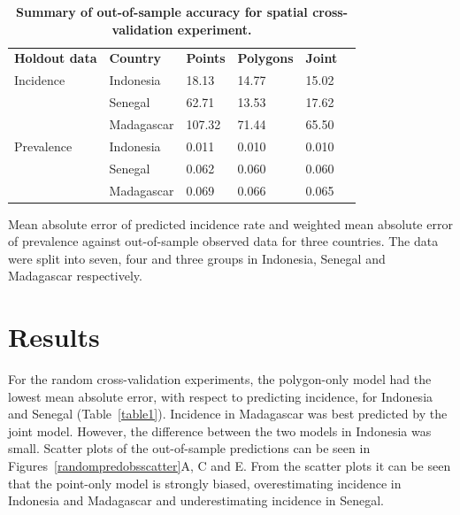 \documentclass[10pt,letterpaper]{article}
\newlength\savedwidth
\newcommand\thickhline{\noalign{\global\savedwidth\arrayrulewidth\global\arrayrulewidth 2pt}%
\hline
\noalign{\global\arrayrulewidth\savedwidth}}
\begin{document}
\begin{table}[!t]
\begin{adjustwidth}{-2.25in}{0in} %
\centering
\caption{
{\bf Summary of out-of-sample accuracy for spatial cross-validation experiment.}}
\begin{tabular}{llllll}
\hline
{\bf Holdout data} & {\bf Country} &  {\bf Points} & {\bf Polygons} & {\bf Joint} \\
\thickhline 
Incidence & Indonesia &  18.13 &  14.77 &   15.02\\
& Senegal &  62.71 &  13.53 &   17.62\\
& Madagascar & 107.32 &  71.44 &   65.50\vspace{3mm}\\
Prevalence & Indonesia & 0.011 & 0.010 &  0.010\\
& Senegal & 0.062 & 0.060 &  0.060\\
& Madagascar & 0.069 & 0.066 &  0.065\\
\end{tabular}
\begin{flushleft}
Mean absolute error of predicted incidence rate and weighted mean absolute error of prevalence against out-of-sample observed data for three countries.
The data were split into seven, four and three groups in Indonesia, Senegal and Madagascar respectively.
\end{flushleft}
\label{table2}
\end{adjustwidth}
\end{table}



\section*{Results}




For the random cross-validation experiments, the polygon-only model had the lowest mean absolute error, with respect to predicting incidence, for Indonesia and Senegal (Table~\ref{table1}).
Incidence in Madagascar was best predicted by the joint model.
However, the difference between the two models in Indonesia was small.
Scatter plots of the out-of-sample predictions can be seen in Figures~\ref{randompredobsscatter}A, C and E.
From the scatter plots it can be seen that the point-only model is strongly biased, overestimating incidence in Indonesia and Madagascar and underestimating incidence in Senegal.
\end{document}

